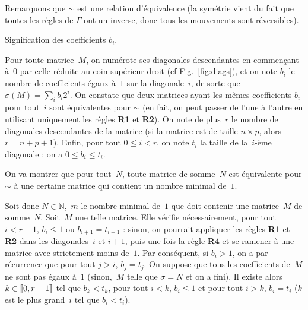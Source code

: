 \documentclass[11pt, openany, a4paper]{article}
\newcommand{\cg }{[\kern-0.15em [}
\newcommand{\cd}{]\kern-0.15em]}
\newcommand{\N}{\mathbb{N}}
\newcommand\tikzmark[1]{%
  \tikz[overlay,remember picture,baseline] 
  \node[anchor=base](#1){};}
\begin{document}
Remarquons que $\sim$ est une relation d'équivalence (la symétrie vient du fait que toutes les règles de $\Gamma$ ont un inverse, donc tous les mouvements sont réversibles).



\begin{floatingfigure}[r]{.5\textwidth}
\centering


\caption{Signification des coefficients $b_i$.}
\label{fig:diags}
\end{floatingfigure}
Pour toute matrice~$M$, on numérote ses diagonales descendantes en commençant à~$0$ par celle réduite au coin supérieur droit (cf Fig.~\ref{fig:diags}), et on note $b_i$ le nombre de coefficients égaux à~$1$ sur la diagonale~$i$, de sorte que \linebreak \mbox{$\sigma (M) = \sum\limits_ib_i2^i$}. On constate que deux matrices ayant les mêmes coefficients $b_i$ pour tout~$i$ sont équivalentes pour $\sim$ (en fait, on peut passer de l'une à l'autre en utilisant uniquement les règles \textbf{R1} et \textbf{R2}). On note de plus~$r$ le nombre de diagonales descendantes de la matrice (si la matrice est de taille $n\times p$, alors $r = n+p+1$). Enfin, pour tout $0\leq i < r$, on note $t_i$ la taille de la~$i$-ème diagonale : on a $0\leq b_i \leq t_i$. 
 
On va montrer que pour tout~$N$, toute matrice de somme~$N$ est équivalente pour $\sim$ à une certaine matrice qui contient un nombre minimal de~$1$.

Soit donc $N \in \N$,~$m$ le nombre minimal de~$1$ que doit contenir une matrice~$M$ de somme~$N$. Soit~$M$ une telle matrice. Elle vérifie nécessairement, pour tout $i<r-1$, $b_i \leq 1$ ou $b_{i+1}=t_{i+1}$ : sinon, on pourrait appliquer les règles \textbf{R1} et \textbf{R2} dans les diagonales~$i$ et $i+1$, puis une fois la règle \textbf{R4} et se ramener à une matrice avec strictement moins de~$1$.
Par conséquent, si $b_i > 1$, on a par récurrence que pour tout $j>i$, $b_j = t_j$.
On suppose que tous les coefficients de~$M$ ne sont pas égaux à~$1$ (sinon,~$M$ telle que $\sigma = N$ et on a fini).
Il existe alors $k \in \cg 0, r-1 \cd$ tel que $b_k<t_k$, pour tout  $i<k$, $b_i \leq 1$ et pour tout $i>k$, $b_i=t_i$ ($k$ est le plus grand~$i$ tel que $b_i < t_i$).
\end{document}
